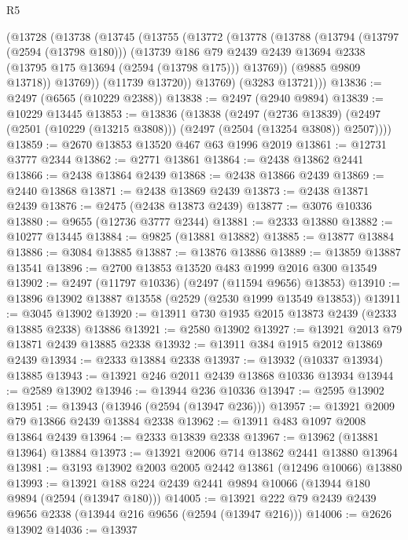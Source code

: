 \begin{lexlean}{R5}
\begin{coremodule}
    (@13728
      (@13738
        (@13745
          (@13755
            (@13772
              (@13778
                (@13788
                  (@13794
                    (@13797 (@2594 (@13798 @180)))
                    (@13739
                      @186
                      @79
                      @2439
                      @2439
                      @13694
                      @2338
                      (@13795 @175 @13694 (@2594 (@13798 @175)))
                      @13769))
                  (@9885 @9809 @13718))
                @13769))
            (@11739 @13720))
          @13769)
        (@3283 @13721)))
@13836 := @2497 (@6565 (@10229 @2388))
@13838 := @2497 (@2940 @9894)
@13839 := @10229 @13445
@13853 := @13836
    (@13838
      (@2497
        (@2736 @13839)
        (@2497 (@2501 (@10229 (@13215 @3808))) (@2497 (@2504 (@13254 @3808)) @2507))))
@13859 := @2670 @13853 @13520 @467 @63 @1996 @2019
@13861 := @12731 @3777 @2344
@13862 := @2771 @13861
@13864 := @2438 @13862 @2441
@13866 := @2438 @13864 @2439
@13868 := @2438 @13866 @2439
@13869 := @2440 @13868
@13871 := @2438 @13869 @2439
@13873 := @2438 @13871 @2439
@13876 := @2475 (@2438 @13873 @2439)
@13877 := @3076 @10336
@13880 := @9655 (@12736 @3777 @2344)
@13881 := @2333 @13880
@13882 := @10277 @13445
@13884 := @9825 (@13881 @13882)
@13885 := @13877 @13884
@13886 := @3084 @13885
@13887 := @13876 @13886
@13889 := @13859 @13887 @13541
@13896 := @2700 @13853 @13520 @483 @1999 @2016 @300 @13549
@13902 := @2497 (@11797 @10336) (@2497 (@11594 @9656) @13853)
@13910 := @13896 @13902 @13887 @13558 (@2529 (@2530 @1999 @13549 @13853))
@13911 := @3045 @13902
@13920 := @13911 @730 @1935 @2015 @13873 @2439 (@2333 @13885 @2338) @13886
@13921 := @2580 @13902
@13927 := @13921 @2013 @79 @13871 @2439 @13885 @2338
@13932 := @13911 @384 @1915 @2012 @13869 @2439
@13934 := @2333 @13884 @2338
@13937 := @13932 (@10337 @13934) @13885
@13943 := @13921 @246 @2011 @2439 @13868 @10336 @13934
@13944 := @2589 @13902
@13946 := @13944 @236 @10336
@13947 := @2595 @13902
@13951 := @13943 (@13946 (@2594 (@13947 @236)))
@13957 := @13921 @2009 @79 @13866 @2439 @13884 @2338
@13962 := @13911 @483 @1097 @2008 @13864 @2439
@13964 := @2333 @13839 @2338
@13967 := @13962 (@13881 @13964) @13884
@13973 := @13921 @2006 @714 @13862 @2441 @13880 @13964
@13981 := @3193 @13902 @2003 @2005 @2442 @13861 (@12496 @10066) @13880
@13993 := @13921 @188 @224 @2439 @2441 @9894 @10066 (@13944 @180 @9894 (@2594 (@13947 @180)))
@14005 := @13921 @222 @79 @2439 @2439 @9656 @2338 (@13944 @216 @9656 (@2594 (@13947 @216)))
@14006 := @2626 @13902
@14036 := @13937

\end{coremodule}
\end{lexlean}
